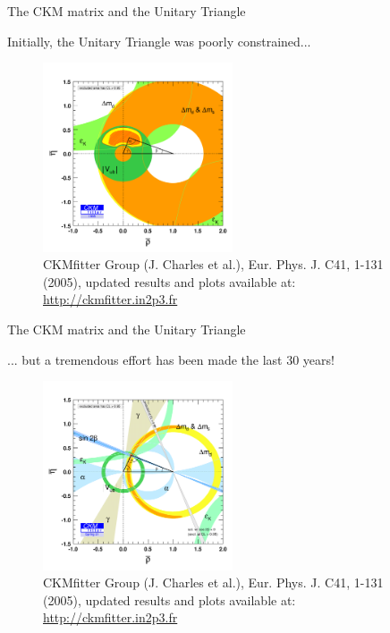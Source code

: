 \documentclass[dvipsnames]{beamer}
\begin{document}
\begin{frame}{The CKM matrix and the Unitary Triangle}
  \begin{center}
    Initially, the Unitary Triangle was poorly constrained...
  \end{center}
  \vspace{-0.2cm}
  \begin{figure}
    \includegraphics[width = 0.50\textwidth]{Plots/CKM_global_1995.png}
    \vspace{-0.3cm}
    \caption*{\centering\tiny CKMfitter Group (J. Charles et al.), Eur. Phys. J. C41, 1-131 (2005), updated results and plots available at: \href{http://ckmfitter.in2p3.fr}{http://ckmfitter.in2p3.fr}}
  \end{figure}
\end{frame}

\begin{frame}{The CKM matrix and the Unitary Triangle}
  \begin{center}
    ... but a tremendous effort has been made the last 30 years!
  \end{center}
  \vspace{-0.2cm}
  \begin{figure}
    \includegraphics[width = 0.50\textwidth]{Plots/CKM_global_2021.png}
    \vspace{-0.3cm}
    \caption*{\centering\tiny CKMfitter Group (J. Charles et al.), Eur. Phys. J. C41, 1-131 (2005), updated results and plots available at: \href{http://ckmfitter.in2p3.fr}{http://ckmfitter.in2p3.fr}}
  \end{figure}
\end{frame}
\end{document}
